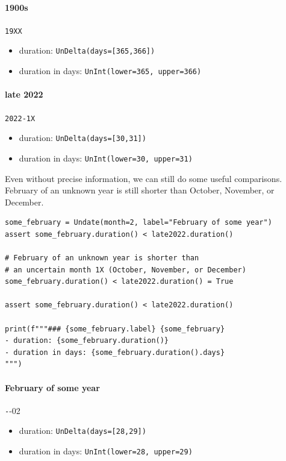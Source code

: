 \documentclass{anthology-ch}         %
\begin{document}
\paragraph{1900s} \texttt{19XX}
\begin{itemize}
    \item duration: \texttt{UnDelta(days=[365,366])}
    \item duration in days: \texttt{UnInt(lower=365, upper=366)}
\end{itemize}

\paragraph{late 2022} \texttt{2022-1X}
\begin{itemize}
    \item duration: \texttt{UnDelta(days=[30,31])}
    \item duration in days: \texttt{UnInt(lower=30, upper=31)}
\end{itemize}
    
    
Even without precise information, we can still do some useful comparisons. February of an unknown year is still shorter than October, November, or December.

\begin{verbatim}
some_february = Undate(month=2, label="February of some year")
assert some_february.duration() < late2022.duration()

# February of an unknown year is shorter than 
# an uncertain month 1X (October, November, or December) 
some_february.duration() < late2022.duration() = True

assert some_february.duration() < late2022.duration()

print(f"""### {some_february.label} {some_february}
- duration: {some_february.duration()}
- duration in days: {some_february.duration().days}
""")

\end{verbatim}

\paragraph{February of some year} \texttt{-}{-02}
\begin{itemize}
    \item duration: \texttt{UnDelta(days=[28,29])}
    \item duration in days: \texttt{UnInt(lower=28, upper=29)}
\end{itemize}
    
\end{document}

